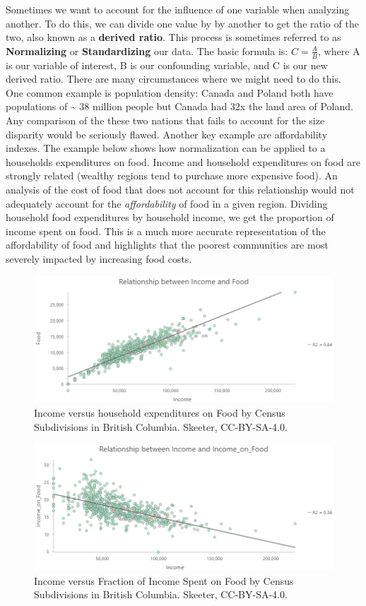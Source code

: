 \documentclass[
]{book}
\begin{document}
Sometimes we want to account for the influence of one variable when analyzing another. To do this, we can divide one value by by another to get the ratio of the two, also known as a \textbf{derived ratio}. This process is sometimes referred to as \textbf{Normalizing} or \textbf{Standardizing} our data. The basic formula is: \(C=\frac{A}{B}\), where A is our variable of interest, B is our confounding variable, and C is our new derived ratio. There are many circumstances where we might need to do this. One common example is population density: Canada and Poland both have populations of \textasciitilde{} 38 million people but Canada had 32x the land area of Poland. Any comparison of the these two nations that fails to account for the size disparity would be seriously flawed. Another key example are affordability indexes. The example below shows how normalization can be applied to a households expenditures on food. Income and household expenditures on food are strongly related (wealthy regions tend to purchase more expensive food). An analysis of the cost of food that does not account for this relationship would not adequately account for the \emph{affordability} of food in a given region. Dividing household food expenditures by household income, we get the proportion of income spent on food. This is a much more accurate representation of the affordability of food and highlights that the poorest communities are most severely impacted by increasing food costs.

\begin{figure}
\includegraphics[width=0.75\linewidth]{images/03-income-v-food} \caption{Income versus household expenditures on Food by Census Subdivisions in British Columbia. Skeeter, CC-BY-SA-4.0.}\label{fig:3-income-v-food}
\end{figure}

\begin{figure}
\includegraphics[width=0.75\linewidth]{images/03-income-v-income-on-food} \caption{Income versus Fraction of Income Spent on Food by Census Subdivisions in British Columbia. Skeeter, CC-BY-SA-4.0.}\label{fig:3-income-v-income-on-food}
\end{figure}
\end{document}
